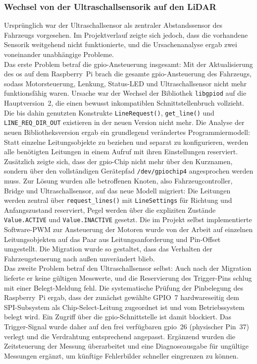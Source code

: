 \subsubsection{Wechsel von der Ultraschallsensorik auf den LiDAR}
Ursprünglich war der Ultraschallsensor als zentraler Abstandssensor des Fahrzeugs vorgesehen. Im Projektverlauf zeigte sich jedoch, dass die vorhandene Sensorik weitgehend nicht funktionierte, und die Ursachenanalyse ergab zwei voneinander unabhängige Probleme.
\\
Das erste Problem betraf die \gls{gpio}-Ansteuerung insgesamt: Mit der Aktualisierung des \gls{os} auf dem Raspberry~Pi brach die gesamte \gls{gpio}-Ansteuerung des Fahrzeugs, sodass Motorsteuerung, Lenkung, Status-LED und Ultraschallsensor nicht mehr funktionsfähig waren. Ursache war der Wechsel der Bibliothek \texttt{libgpiod} auf die Hauptversion~2, die einen bewusst inkompatiblen Schnittstellenbruch vollzieht. Die bis dahin genutzten Konstrukte \texttt{LineRequest()}, \texttt{get\_line()} und \texttt{LINE\_REQ\_DIR\_OUT} existieren in der neuen Version nicht mehr. Die Analyse der neuen Bibliotheksversion ergab ein grundlegend verändertes Programmiermodell: Statt einzelne Leitungsobjekte zu beziehen und separat zu konfigurieren, werden alle benötigten Leitungen in einem Aufruf mit ihren Einstellungen reserviert. Zusätzlich zeigte sich, dass der \gls{gpio}-Chip nicht mehr über den Kurznamen, sondern über den vollständigen Gerätepfad \texttt{/dev/gpiochip4} angesprochen werden muss. Zur Lösung wurden alle betroffenen Knoten, also Fahrzeugcontroller, Bridge und Ultraschallsensor, auf das neue Modell migriert: Die Leitungen werden zentral über \texttt{request\_lines()} mit \texttt{LineSettings} für Richtung und Anfangszustand reserviert, Pegel werden über die expliziten Zustände \texttt{Value.ACTIVE} und \texttt{Value.INACTIVE} gesetzt. Die im Projekt selbst implementierte Software-PWM zur Ansteuerung der Motoren wurde von der Arbeit auf einzelnen Leitungsobjekten auf das Paar aus Leitungsanforderung und Pin-Offset umgestellt. Die Migration wurde so gestaltet, dass das Verhalten der Fahrzeugsteuerung nach außen unverändert blieb.
\\
Das zweite Problem betraf den Ultraschallsensor selbst: Auch nach der Migration lieferte er keine gültigen Messwerte, und die Reservierung des Trigger-Pins schlug mit einer Belegt-Meldung fehl. Die systematische Prüfung der Pinbelegung des Raspberry~Pi ergab, dass der zunächst gewählte GPIO~7 hardwareseitig dem SPI-Subsystem als Chip-Select-Leitung zugeordnet ist und vom Betriebssystem belegt wird. Ein Zugriff über die \gls{gpio}-Schnittstelle ist damit blockiert. Das Trigger-Signal wurde daher auf den frei verfügbaren \gls{gpio}~26 (physischer Pin~37) verlegt und die Verdrahtung entsprechend angepasst. Ergänzend wurden die Zeitsteuerung der Messung überarbeitet und eine Diagnoseausgabe für ungültige Messungen ergänzt, um künftige Fehlerbilder schneller eingrenzen zu können.
